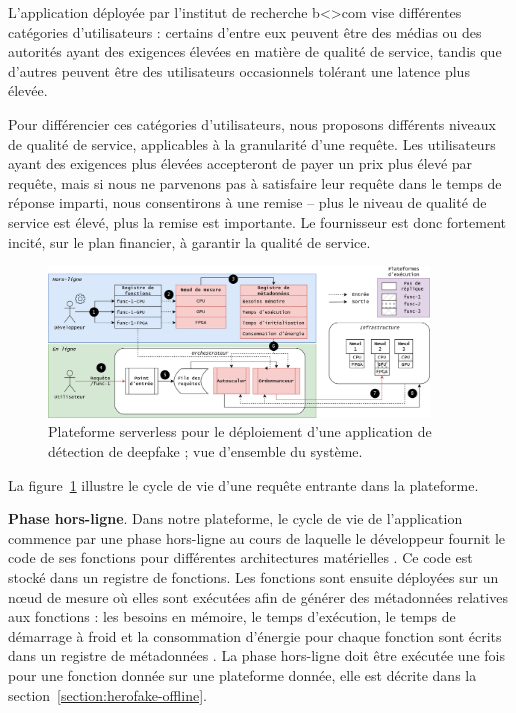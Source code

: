 L'application déployée par l'institut de recherche b{\textless\textgreater}com vise différentes catégories d'utilisateurs : certains d'entre eux peuvent être des médias ou des autorités ayant des exigences élevées en matière de qualité de service, tandis que d'autres peuvent être des utilisateurs occasionnels tolérant une latence plus élevée.

Pour différencier ces catégories d'utilisateurs, nous proposons différents niveaux de qualité de service, applicables à la granularité d'une requête. Les utilisateurs ayant des exigences plus élevées accepteront de payer un prix plus élevé par requête, mais si nous ne parvenons pas à satisfaire leur requête dans le temps de réponse imparti, nous consentirons à une remise -- plus le niveau de qualité de service est élevé, plus la remise est importante. Le fournisseur est donc fortement incité, sur le plan financier, à garantir la qualité de service.

\begin{figure}[!ht]
    \centering
    \includegraphics[width=0.9\textwidth]{4_Chapitre4/figures/placement.png}
    \caption{Plateforme serverless pour le déploiement d'une application de détection de deepfake ; vue d'ensemble du système.}
    \label{figure:herofake-placement}
\end{figure}

La figure~\ref{figure:herofake-placement} illustre le cycle de vie d'une requête entrante dans la plateforme.

\textbf{Phase hors-ligne}. Dans notre plateforme, le cycle de vie de l'application commence par une phase hors-ligne au cours de laquelle le développeur fournit le code de ses fonctions pour différentes architectures matérielles . Ce code est stocké dans un registre de fonctions. Les fonctions sont ensuite déployées sur un nœud de mesure  où elles sont exécutées afin de générer des métadonnées relatives aux fonctions : les besoins en mémoire, le temps d'exécution, le temps de démarrage à froid et la consommation d'énergie pour chaque fonction sont écrits dans un registre de métadonnées . La phase hors-ligne doit être exécutée une fois pour une fonction donnée sur une plateforme donnée, elle est décrite dans la section~\ref{section:herofake-offline}.

